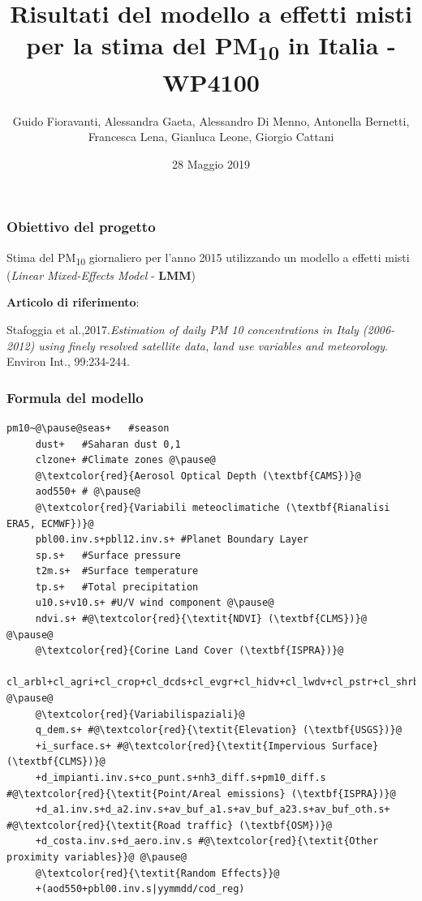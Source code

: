 \documentclass{beamer}
\title{Risultati del modello a effetti misti per la stima del PM\textsubscript{10} in Italia - \textbf{WP4100}}
\author{Guido Fioravanti, Alessandra Gaeta, Alessandro Di Menno, Antonella Bernetti, Francesca Lena, Gianluca Leone, Giorgio Cattani}
\date{28 Maggio 2019}
\institute{Istituto Superiore Per la Protezione e la Ricerca Ambientale}
\begin{document}

\maketitle

\begin{frame}

\frametitle{Obiettivo del progetto}
{\large Stima del PM\textsubscript{10} giornaliero per l'anno 2015 utilizzando un modello a effetti misti (\textit{Linear Mixed-Effects Model} - \textbf{LMM})\par}
\vspace{\baselineskip} %
\textbf{Articolo di riferimento}:\\
{\scriptsize Stafoggia et al.,2017.\textit{Estimation of daily PM 10 concentrations in Italy (2006-2012) using finely resolved satellite
data, land use variables and meteorology}.\\ Environ Int., 99:234-244.\par}

\end{frame}


\begin{frame}[fragile]
\frametitle{Formula del modello}

\begin{lstlisting}
pm10~@\pause@seas+   #season
     dust+   #Saharan dust 0,1
     clzone+ #Climate zones @\pause@
     @\textcolor{red}{Aerosol Optical Depth (\textbf{CAMS})}@	
     aod550+ # @\pause@
     @\textcolor{red}{Variabili meteoclimatiche (\textbf{Rianalisi ERA5, ECMWF})}@	
     pbl00.inv.s+pbl12.inv.s+ #Planet Boundary Layer
     sp.s+   #Surface pressure
     t2m.s+  #Surface temperature
     tp.s+   #Total precipitation
     u10.s+v10.s+ #U/V wind component @\pause@
     ndvi.s+ #@\textcolor{red}{\textit{NDVI} (\textbf{CLMS})}@ @\pause@
     @\textcolor{red}{Corine Land Cover (\textbf{ISPRA})}@
     cl_arbl+cl_agri+cl_crop+cl_dcds+cl_evgr+cl_hidv+cl_lwdv+cl_pstr+cl_shrb+ 	@\pause@
     @\textcolor{red}{Variabilispaziali}@
     q_dem.s+ #@\textcolor{red}{\textit{Elevation} (\textbf{USGS})}@
     +i_surface.s+ #@\textcolor{red}{\textit{Impervious Surface} (\textbf{CLMS})}@
     +d_impianti.inv.s+co_punt.s+nh3_diff.s+pm10_diff.s #@\textcolor{red}{\textit{Point/Areal emissions} (\textbf{ISPRA})}@
     +d_a1.inv.s+d_a2.inv.s+av_buf_a1.s+av_buf_a23.s+av_buf_oth.s+ #@\textcolor{red}{\textit{Road traffic} (\textbf{OSM})}@
     +d_costa.inv.s+d_aero.inv.s #@\textcolor{red}{\textit{Other proximity variables}}@ @\pause@
     @\textcolor{red}{\textit{Random Effects}}@ 
     +(aod550+pbl00.inv.s|yymmdd/cod_reg)
     	

\end{lstlisting}

\end{frame}
\end{document}
